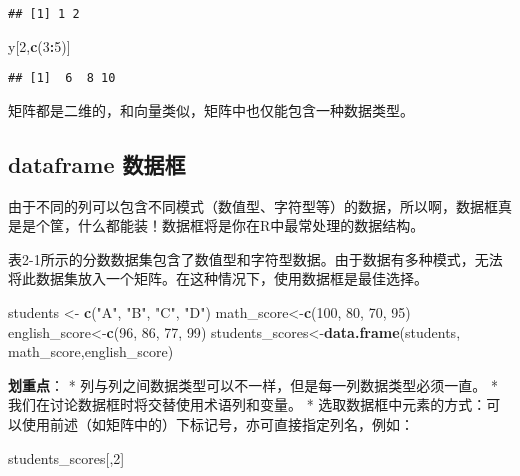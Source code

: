 \documentclass[]{book}
\newenvironment{Shaded}{\begin{snugshade}}{\end{snugshade}}
\newcommand{\DecValTok}[1]{\textcolor[rgb]{0.00,0.00,0.81}{#1}}
\newcommand{\KeywordTok}[1]{\textcolor[rgb]{0.13,0.29,0.53}{\textbf{#1}}}
\newcommand{\NormalTok}[1]{#1}
\newcommand{\OperatorTok}[1]{\textcolor[rgb]{0.81,0.36,0.00}{\textbf{#1}}}
\newcommand{\StringTok}[1]{\textcolor[rgb]{0.31,0.60,0.02}{#1}}
\begin{document}
\begin{verbatim}
## [1] 1 2
\end{verbatim}

\begin{Shaded}
\begin{Highlighting}[]
\NormalTok{y[}\DecValTok{2}\NormalTok{,}\KeywordTok{c}\NormalTok{(}\DecValTok{3}\OperatorTok{:}\DecValTok{5}\NormalTok{)]}
\end{Highlighting}
\end{Shaded}

\begin{verbatim}
## [1]  6  8 10
\end{verbatim}

矩阵都是二维的，和向量类似，矩阵中也仅能包含一种数据类型。

\hypertarget{dataframe-}{%
\subsection{dataframe 数据框}\label{dataframe-}}

由于不同的列可以包含不同模式（数值型、字符型等）的数据，所以啊，数据框真是是个筐，什么都能装！数据框将是你在R中最常处理的数据结构。

表2-1所示的分数数据集包含了数值型和字符型数据。由于数据有多种模式，无法将此数据集放入一个矩阵。在这种情况下，使用数据框是最佳选择。

\begin{Shaded}
\begin{Highlighting}[]
\NormalTok{students <-}\StringTok{ }\KeywordTok{c}\NormalTok{(}\StringTok{"A"}\NormalTok{, }\StringTok{"B"}\NormalTok{, }\StringTok{"C"}\NormalTok{, }\StringTok{"D"}\NormalTok{)}
\NormalTok{math_score<-}\KeywordTok{c}\NormalTok{(}\DecValTok{100}\NormalTok{, }\DecValTok{80}\NormalTok{, }\DecValTok{70}\NormalTok{, }\DecValTok{95}\NormalTok{)}
\NormalTok{english_score<-}\KeywordTok{c}\NormalTok{(}\DecValTok{96}\NormalTok{, }\DecValTok{86}\NormalTok{, }\DecValTok{77}\NormalTok{, }\DecValTok{99}\NormalTok{)}
\NormalTok{students_scores<-}\KeywordTok{data.frame}\NormalTok{(students, math_score,english_score)}
\end{Highlighting}
\end{Shaded}

\textbf{划重点}： *
列与列之间数据类型可以不一样，但是每一列数据类型必须一直。 *
我们在讨论数据框时将交替使用术语列和变量。 *
选取数据框中元素的方式：可以使用前述（如矩阵中的）下标记号，亦可直接指定列名，例如：

\begin{Shaded}
\begin{Highlighting}[]
\NormalTok{students_scores[,}\DecValTok{2}\NormalTok{]}
\end{Highlighting}
\end{Shaded}
\end{document}
